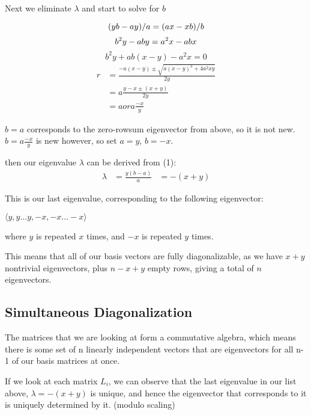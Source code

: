 \documentclass{report}
\begin{document}
Next we eliminate $\lambda$ and start to solve for $b$

\begin{equation*}
	(yb - ay)/a = (ax - xb)/b\\
\end{equation*}
\begin{equation*}
	b^2y - aby = a^2x - abx\\
\end{equation*}
\begin{equation*}
	b^2y + ab(x - y) - a^2x = 0
\end{equation*}
\begin{align*}
	r &= \frac{-a(x-y) \pm \sqrt{{a(x-y)}^2 + 4a^2xy}}{2y}\\
	  &= a\frac{y - x \pm (x + y)}{2y}\\
	  &= a or a\frac{-x}{y}
\end{align*}

$b = a$ corresponds to the zero-rowsum eigenvector from above, so it is not
new.
$b = a\frac{-x}{y}$ is new however, so set $a = y$, $b = -x$.

then our eigenvalue $\lambda$ can be derived from (1):
\begin{align*}
	\lambda &= \frac{y(b - a)}{a}
			&= -(x + y)
\end{align*}

This is our last eigenvalue, corresponding to the following eigenvector:

$\langle y, y\ldots y, -x, -x\ldots -x\rangle$

where $y$ is repeated $x$ times, and $-x$ is repeated $y$ times.

This means that all of our basis vectors are fully diagonalizable, as we have
$x+y$ nontrivial eigenvectors, plus $n-x+y$ empty rows, giving a total of $n$
eigenvectors.

\subsection{Simultaneous Diagonalization}

The matrices that we are looking at form a commutative algebra, which means
there is some set of n linearly independent vectors that are eigenvectors for
all n-1 of our basis matrices at once.

If we look at each matrix $L_i$, we can observe that the last eigenvalue in our
list above, $\lambda = -(x + y)$ is unique, and hence the eigenvector that
corresponds to it is uniquely determined by it. (modulo scaling)
\end{document}
